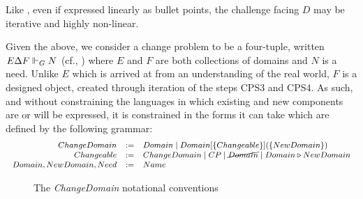 \documentclass[runningheads,a4paper]{llncs}
\begin{document}
Like \POE{} \cite{hall2016a-design}, even if expressed linearly as bullet points, the challenge facing $D$ may be iterative and highly non-linear.

\newcommand\CM{Pixel}
\def\ColourMaker#{\textit{ColourMaker} (shortly \textit{CoMa})\gdef\ColourMaker{\textit{CoMa}}}
\newcommand{\code}[1]{\texttt{#1}}
\newcommand{\solved}{\relax}
\newcommand{\replacedBy}{\triangleright}
\newcommand{\Java}{Swift}

Given the above, we consider a change problem to be a four-tuple, written $E\Delta F\Vdash_G N$ (cf., \cite{hall2016a-design}) where $E$ and $F$ are both collections of domains and $N$ is a need. Unlike $E$ which is arrived at from an understanding of the real world, $F$ is a designed object, created through iteration of the steps CPS3 and CPS4. As such, and without constraining the languages in which existing and new components are or will be expressed, it is constrained in the forms it can take which are defined by the following grammar:
%
\[\footnotesize\begin{array}{rcll}
	ChangeDomain &:=& Domain \mid Domain[\{Changeable\}](\{NewDomain\})\\
	Changeable &:=& ChangeDomain \mid CP \mid \cancel{Domain} \mid Domain \replacedBy NewDomain\\
	Domain, NewDomain, Need &:=& Name
\end{array}\]
%
\begin{figure}
  \caption{The \textit{ChangeDomain} notational conventions}
  \label{fig:notationIllustration}
\end{figure}
\end{document}
